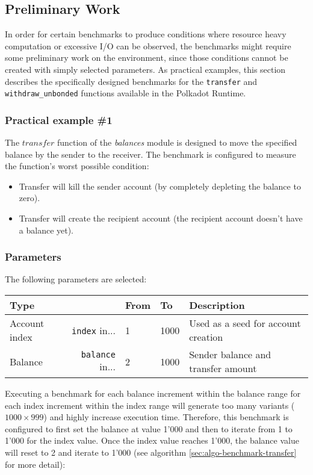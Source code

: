 \documentclass[11pt,a4paper]{article}
\begin{document}
\subsection{Preliminary Work}\label{sect:examples-preliminary-work} In order for
certain benchmarks to produce conditions where resource heavy computation or
excessive I/O can be observed, the benchmarks might require some preliminary
work on the environment, since those conditions cannot be created with simply
selected parameters. As practical examples, this section describes the
specifically designed benchmarks for the \verb|transfer| and
\verb|withdraw_unbonded| functions available in the Polkadot Runtime.

\subsubsection{Practical example \#1}
The $transfer$ function of the \textit{balances} module is designed to move the
specified balance by the sender to the receiver. The benchmark is configured to
measure the function's worst possible condition:

\begin{itemize}
  \item Transfer will kill the sender account (by completely depleting the
  balance to zero).
  \item Transfer will create the recipient account (the recipient account
  doesn't have a balance yet).
\end{itemize}

\subsubsection*{Parameters}
The following parameters are selected:

\begin{center}
  \begin{tabular}{ l|r l l l }
    \textbf{Type} && \textbf{From} & \textbf{To} & \textbf{Description}\\
    \hline
    Account index & \verb|index| in... & 1 & 1000 & Used as a seed for account
    creation \\
    Balance & \verb|balance| in... & 2 & 1000 & Sender balance and transfer
    amount \\
  \end{tabular}
\end{center}

Executing a benchmark for each balance increment within the balance range for
each index increment within the index range will generate too many variants
($1000 \times 999$) and highly increase execution time. Therefore, this
benchmark is configured to first set the balance at value 1'000 and then to
iterate from 1 to 1'000 for the index value. Once the index value reaches 1'000,
the balance value will reset to 2 and iterate to 1'000 (see algorithm
\ref{sec:algo-benchmark-transfer} for more detail):
\end{document}
